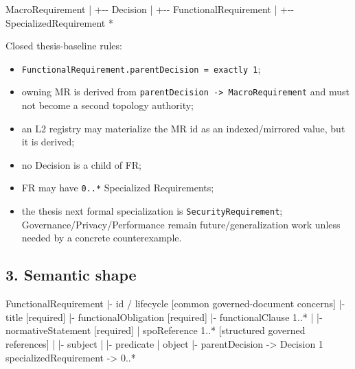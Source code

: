 \documentclass[
  10pt,
]{article}
\newenvironment{Shaded}{}{}
\newcommand{\NormalTok}[1]{#1}
\providecommand{\tightlist}{%
  \setlength{\itemsep}{0pt}\setlength{\parskip}{0pt}}
\begin{document}
\begin{Shaded}
\begin{Highlighting}[]
\NormalTok{MacroRequirement}
\NormalTok{    |}
\NormalTok{    +{-}{-} Decision}
\NormalTok{           |}
\NormalTok{           +{-}{-} FunctionalRequirement}
\NormalTok{                  |}
\NormalTok{                  +{-}{-} SpecializedRequirement *}
\end{Highlighting}
\end{Shaded}

Closed thesis-baseline rules:

\begin{itemize}
\tightlist
\item
  \texttt{FunctionalRequirement.parentDecision\ =\ exactly\ 1};
\item
  owning MR is derived from
  \texttt{parentDecision\ -\textgreater{}\ MacroRequirement} and must
  not become a second topology authority;
\item
  an L2 registry may materialize the MR id as an indexed/mirrored value,
  but it is derived;
\item
  no Decision is a child of FR;
\item
  FR may have \texttt{0..*} Specialized Requirements;
\item
  the thesis next formal specialization is \texttt{SecurityRequirement};
  Governance/Privacy/Performance remain future/generalization work
  unless needed by a concrete counterexample.
\end{itemize}

\subsection{3. Semantic shape}\label{3-semantic-shape}

\begin{Shaded}
\begin{Highlighting}[]
\NormalTok{FunctionalRequirement}
\NormalTok{|{-} id / lifecycle                 [common governed{-}document concerns]}
\NormalTok{|{-} title                          [required]}
\NormalTok{|{-} functionalObligation           [required]}
\NormalTok{|{-} functionalClause 1..*}
\NormalTok{|    |{-} normativeStatement        [required]}
\NormalTok{|    \textasciigrave{}{-} spoReference 1..*         [structured governed references]}
\NormalTok{|         |{-} subject}
\NormalTok{|         |{-} predicate}
\NormalTok{|         \textasciigrave{}{-} object}
\NormalTok{|{-} parentDecision {-}\textgreater{} Decision 1}
\NormalTok{\textasciigrave{}{-} specializedRequirement {-}\textgreater{} 0..*}
\end{Highlighting}
\end{Shaded}
\end{document}
